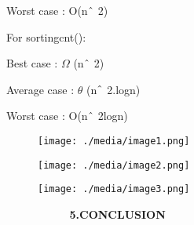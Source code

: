 \documentclass[12pt]{report}
\renewcommand{\_}{\kern-1.5pt\textunderscore\kern-1.5pt}
\begin{document}
\begin{multicols}{2}
\begin{FlushLeft}
Worst case : O(n$ \string^ $ 2)
\end{FlushLeft}\par


\vspace{\baselineskip}
For sorting\_cnt():\par

Best case : $ \Omega $ (n$ \string^ $ 2)\par

Average case : $ \theta $ (n$ \string^ $ 2.logn)\par

Worst case : O(n$ \string^ $ 2logn)\par


\vspace{\baselineskip}


\begin{figure}[H]
	\begin{FlushLeft}		\texttt{[image: ./media/image1.png]}
	\end{FlushLeft}\end{figure}

\par


\vspace{\baselineskip}


\begin{figure}[H]
	\begin{FlushLeft}		\texttt{[image: ./media/image2.png]}
	\end{FlushLeft}\end{figure}


\par

\begin{figure}[H]
	\begin{FlushLeft}		\texttt{[image: ./media/image3.png]}
	\end{FlushLeft}\end{figure}

\par


\vspace{\baselineskip}

\vspace{\baselineskip}

\vspace{\baselineskip}
\begin{FlushLeft}
\textbf{\ \ \ \ \ \ \ \ \ \  5.CONCLUSION}
\end{FlushLeft}\par


\end{multicols}
\end{document}
